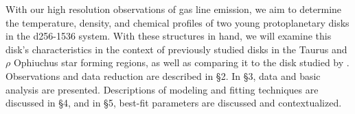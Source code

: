 With our high resolution observations of gas line emission, we aim to determine the temperature, density, and chemical profiles of two young protoplanetary disks in the d256-1536 system. With these structures in hand, we will examine this disk's characteristics in the context of previously studied disks in the Taurus and $\rho$ Ophiuchus star forming regions, as well as comparing it to the disk studied by \citet{Factor2017}. Observations and data reduction are described in \S2. In \S3, data and basic analysis are presented. Descriptions of modeling and fitting techniques are discussed in \S4, and in \S5, best-fit parameters are discussed and contextualized.




















